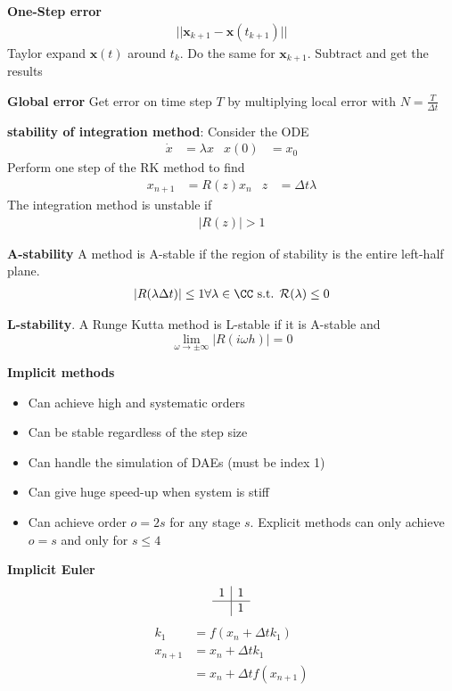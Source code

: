 \textbf{One-Step error}
\begin{align*}
    ||\bm{x}_{k+1}-\bm{x}(t_{k+1})||
\end{align*}
Taylor expand \(\bm{x}(t)\) around \(t_k\). Do the same for \(\bm{x}_{k+1}\). Subtract and get the results
\newline

\textbf{Global error}
Get error on time step \(T\) by multiplying local error with \(N=\frac{T}{\Delta t}\)
\newline

\textbf{stability of integration method}: Consider the ODE
\begin{align*}
    \dot{x}&=\lambda x & x(0) &= x_0
\end{align*}
Perform one step of the RK method to find
\begin{align*}
    x_{n+1} &= R(z)x_n & z &= \Delta t \lambda
\end{align*}
The integration method is unstable if
\begin{align*}
    |R(z)| > 1
\end{align*}

\textbf{A-stability}
A method is A-stable if the region of stability is the entire left-half plane.
\begin{align*}
    |R(\lambda\Delta t)|\leq 1 \forall \lambda \in \CC \textrm{ s.t. } \mathcal{R}(\lambda) \leq 0
\end{align*}

\textbf{L-stability}.
A Runge Kutta method is L-stable if it is A-stable and
\[\lim_{\omega \rightarrow \pm \infty}|R(i\omega h)|= 0\]

\textbf{Implicit methods}
\begin{itemize}
    \item Can achieve high and systematic orders
    \item Can be stable regardless of the step size 
    \item Can handle the simulation of DAEs (must be index 1)
    \item Can give huge speed-up when system is stiff
    \item Can achieve order \(o=2s\) for any stage \(s\). Explicit methods can only achieve \(o=s\) and only for \(s\leq4\)
\end{itemize}

\textbf{Implicit Euler}
\begin{align*}
\begin{array}{c|cc}
    1 & 1\\ \hline
     & 1
\end{array}
\end{align*}
\begin{align*}
    k_1 &= f(x_n + \Delta t k_1) \\
    x_{n+1} &= x_n + \Delta t k_1 \\
    &= x_n + \Delta t f(x_{n+1})
\end{align*}



